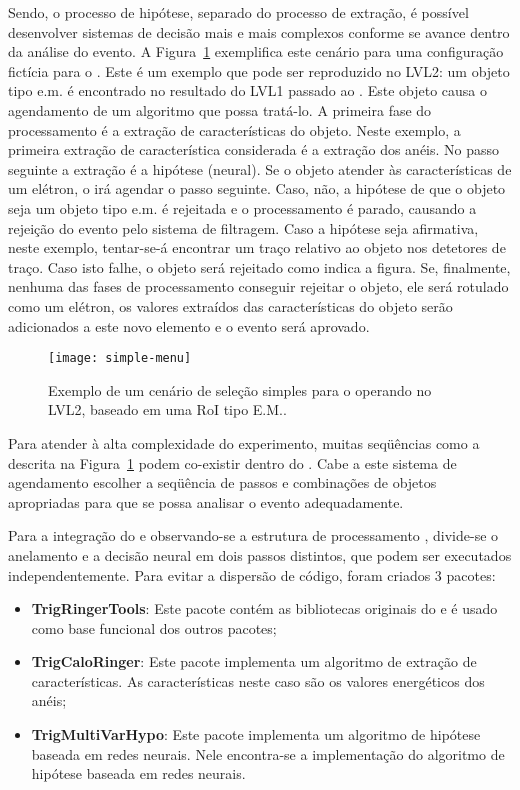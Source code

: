 Sendo, o processo de hipótese, separado do processo de extração, é possível
desenvolver sistemas de decisão mais e mais complexos conforme se avance
dentro da análise do evento. A Figura~\ref{fig:simple-menu} exemplifica este
cenário para uma configuração fictícia para o . Este é um
exemplo que pode ser reproduzido no LVL2: um objeto tipo e.m. é encontrado no
resultado do LVL1 passado ao . Este objeto causa o agendamento
de um algoritmo que possa tratá-lo. A primeira fase do processamento é a
extração de características do objeto. Neste exemplo, a primeira extração de
característica considerada é a extração dos anéis. No passo seguinte a extração
é a hipótese (neural). Se o objeto atender às características de um elétron, o
 irá agendar o passo seguinte. Caso, não, a hipótese de que o
objeto seja um objeto tipo e.m. é rejeitada e o processamento é parado,
causando a rejeição do evento pelo sistema de filtragem. Caso a hipótese seja
afirmativa, neste exemplo, tentar-se-á encontrar um traço relativo ao objeto
nos detetores de traço. Caso isto falhe, o objeto será rejeitado como indica a
figura. Se, finalmente, nenhuma das fases de processamento conseguir rejeitar
o objeto, ele será rotulado como um elétron, os valores extraídos das
características do objeto serão adicionados a este novo elemento e o evento
será aprovado.

\begin{figure}
\begin{center}
\texttt{[image: simple-menu]}
\end{center}
\caption{Exemplo de um cenário de seleção simples para o 
operando no LVL2, baseado em uma RoI tipo E.M..}
\label{fig:simple-menu}
\end{figure}

Para atender à alta complexidade do experimento, muitas seqüências como a
descrita na Figura~\ref{fig:simple-menu} podem co-existir dentro do
. Cabe a este sistema de agendamento escolher a seqüência de
passos e combinações de objetos apropriadas para que se possa analisar o
evento adequadamente.

Para a integração do  e observando-se a estrutura de
processamento , divide-se o anelamento e a decisão neural em dois
passos distintos, que podem ser executados independentemente. Para evitar a
dispersão de código, foram criados 3 pacotes:

\begin{itemize}
\item \textbf{TrigRingerTools}: Este pacote contém as bibliotecas 
originais do  e é usado como base funcional dos outros
pacotes;
\item \textbf{TrigCaloRinger}: Este pacote implementa um algoritmo de 
extração de características. As características neste caso são os valores
energéticos dos anéis;
\item \textbf{TrigMultiVarHypo}: Este pacote implementa um algoritmo de
hipótese baseada em redes neurais. Nele encontra-se a implementação do
algoritmo de hipótese baseada em redes neurais. 
\end{itemize}

